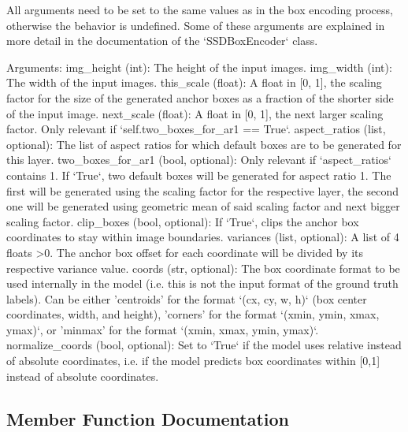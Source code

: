 \begin{DoxyVerb}All arguments need to be set to the same values as in the box encoding process, otherwise the behavior is undefined.
Some of these arguments are explained in more detail in the documentation of the `SSDBoxEncoder` class.

Arguments:
    img_height (int): The height of the input images.
    img_width (int): The width of the input images.
    this_scale (float): A float in [0, 1], the scaling factor for the size of the generated anchor boxes
as a fraction of the shorter side of the input image.
    next_scale (float): A float in [0, 1], the next larger scaling factor. Only relevant if
`self.two_boxes_for_ar1 == True`.
    aspect_ratios (list, optional): The list of aspect ratios for which default boxes are to be
generated for this layer.
    two_boxes_for_ar1 (bool, optional): Only relevant if `aspect_ratios` contains 1.
If `True`, two default boxes will be generated for aspect ratio 1. The first will be generated
using the scaling factor for the respective layer, the second one will be generated using
geometric mean of said scaling factor and next bigger scaling factor.
    clip_boxes (bool, optional): If `True`, clips the anchor box coordinates to stay within image boundaries.
    variances (list, optional): A list of 4 floats >0. The anchor box offset for each coordinate will be divided by
its respective variance value.
    coords (str, optional): The box coordinate format to be used internally in the model (i.e. this is not the input format
of the ground truth labels). Can be either 'centroids' for the format `(cx, cy, w, h)` (box center coordinates, width, and height),
'corners' for the format `(xmin, ymin, xmax,  ymax)`, or 'minmax' for the format `(xmin, xmax, ymin, ymax)`.
    normalize_coords (bool, optional): Set to `True` if the model uses relative instead of absolute coordinates,
i.e. if the model predicts box coordinates within [0,1] instead of absolute coordinates.
\end{DoxyVerb}
 

\subsection{Member Function Documentation}
\mbox{\label{classkeras__utils_1_1keras__layer___anchor_boxes_1_1_anchor_boxes_aae79e1e24e095100c895e09468e79a43}} 
